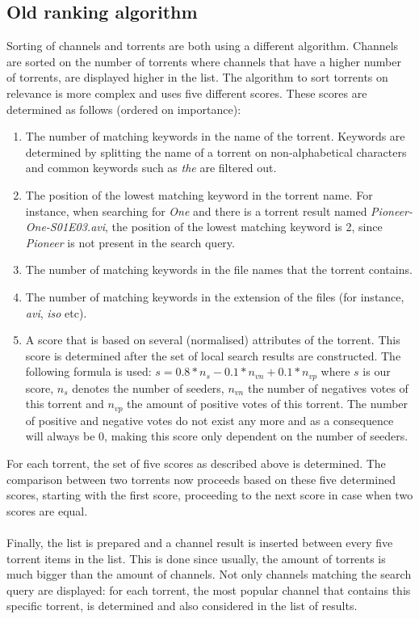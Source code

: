 \subsection{Old ranking algorithm}
Sorting of channels and torrents are both using a different algorithm. Channels are sorted on the number of torrents where channels that have a higher number of torrents, are displayed higher in the list. The algorithm to sort torrents on relevance is more complex and uses five different scores. These scores are determined as follows (ordered on importance):
\begin{enumerate}
	\item The number of matching keywords in the name of the torrent. Keywords are determined by splitting the name of a torrent on non-alphabetical characters and common keywords such as \emph{the} are filtered out.
	\item The position of the lowest matching keyword in the torrent name. For instance, when searching for \emph{One} and there is a torrent result named \emph{Pioneer-One-S01E03.avi}, the position of the lowest matching keyword is 2, since \emph{Pioneer} is not present in the search query.
	\item The number of matching keywords in the file names that the torrent contains.
	\item The number of matching keywords in the extension of the files (for instance, \emph{avi}, \emph{iso} etc).
	\item A score that is based on several (normalised) attributes of the torrent. This score is determined after the set of local search results are constructed. The following formula is used: $ s = 0.8 * n_s - 0.1 * n_{vn} + 0.1 * n_{vp} $ where $ s $ is our score, $ n_s $ denotes the number of seeders, $ n_{vn} $ the number of negatives votes of this torrent and $ n_{vp} $ the amount of positive votes of this torrent. The number of positive and negative votes do not exist any more and as a consequence will always be 0, making this score only dependent on the number of seeders.
\end{enumerate}
For each torrent, the set of five scores as described above is determined. The comparison between two torrents now proceeds based on these five determined scores, starting with the first score, proceeding to the next score in case when two scores are equal.\\\\
Finally, the list is prepared and a channel result is inserted between every five torrent items in the list. This is done since usually, the amount of torrents is much bigger than the amount of channels. Not only channels matching the search query are displayed: for each torrent, the most popular channel that contains this specific torrent, is determined and also considered in the list of results.\\\\
